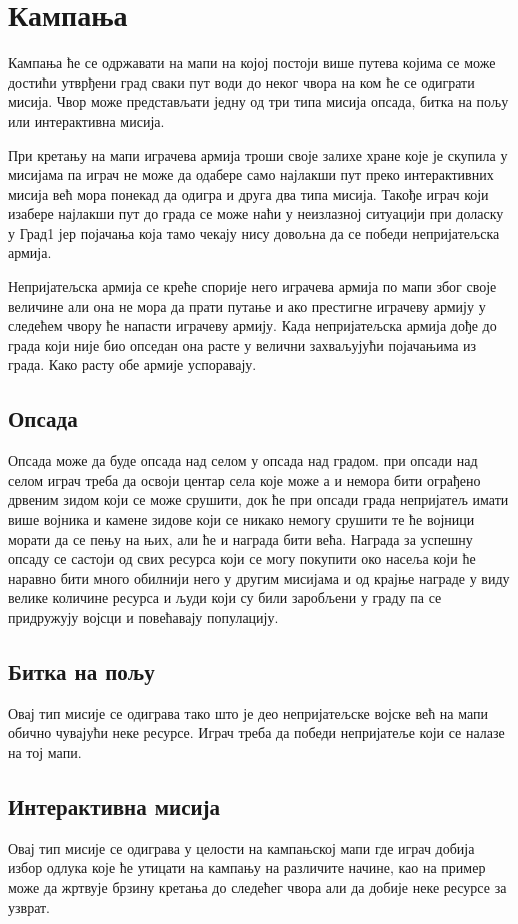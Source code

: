 \documentclass[11pt,a4paper]{report}
\begin{document}
\section{Кампања}
Кампања ће се одржавати на мапи на којој постоји више путева којима се може достићи утврђени град сваки пут води до неког чвора на ком ће се одиграти мисија. Чвор може представљати једну од три типа мисија опсада, битка на пољу или интерактивна мисија.

При кретању на мапи играчева армија троши своје залихе хране које је скупила у мисијама па играч не може да одабере само најлакши пут преко интерактивних мисија већ мора понекад да одигра и друга два типа мисија. Такође играч који изабере најлакши пут до града се може наћи у неизлазној ситуацији при доласку у Град1 јер појачања која тамо чекају нису довољна да се победи непријатељска армија.

Непријатељска армија се креће спорије него играчева армија по мапи због своје величине али она не мора да прати путање и ако престигне играчеву армију у следећем чвору ће напасти играчеву армију. Када непријатељска армија дође до града који није био опседан она расте у велични захваљујући појачањима из града. Како расту обе армије успоравају.
\subsection{Опсада}
Опсада може да буде опсада над селом у опсада над градом. при опсади над селом играч треба да освоји центар села које може а и немора бити ограђено дрвеним зидом који се може срушити, док ће при опсади града непријатељ имати више војника и камене зидове који се никако немогу срушити те ће војници морати да се пењу на њих, али ће и  награда бити већа. Награда за успешну опсаду се састоји од свих ресурса који се могу покупити око насеља  који ће наравно бити много обилнији него у другим мисијама и од крајње награде у виду велике количине ресурса и људи који су били заробљени у граду па се придружују војсци и повећавају популацију.
\subsection{Битка на пољу}
Овај тип мисије се одиграва тако што је део непријатељске војске већ на мапи обично чувајући неке ресурсе. Играч треба да победи непријатеље који се налазе на тој мапи.
\subsection{Интерактивна мисија}
Овај тип мисије се одиграва у целости на кампањској мапи где играч добија избор одлука које ће утицати на кампању на различите начине, као на пример може да жртвује брзину кретања до следећег чвора али да добије неке ресурсе за узврат.
\end{document}
